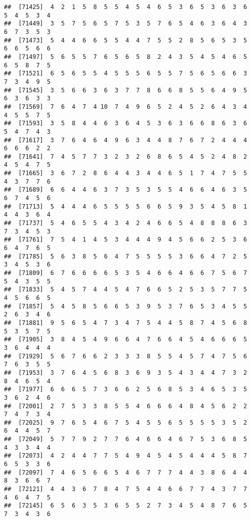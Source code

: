 \documentclass[
]{book}
\begin{document}
\begin{verbatim}
##  [71425]  4  2  1  5  8  5  5  4  5  4  6  5  3  6  5  3  6  3  6  5  4  5  3  4
##  [71449]  3  5  7  5  6  5  7  5  3  5  7  6  5  4  6  3  6  4  3  6  7  3  5  3
##  [71473]  5  4  4  6  6  5  5  4  4  7  5  5  2  8  5  6  5  3  5  6  6  5  6  6
##  [71497]  5  6  5  5  7  6  5  6  5  8  2  4  3  5  4  5  4  6  5  6  5  8  7  5
##  [71521]  6  5  6  5  5  4  5  5  5  6  5  5  7  5  6  5  6  6  3  7  3  4  9  5
##  [71545]  3  5  6  6  3  6  3  7  7  8  6  6  8  5  5  6  4  9  5  6  3  6  3  3
##  [71569]  7  6  4  7  4 10  7  4  9  6  5  2  4  5  2  6  4  3  4  4  5  5  7  5
##  [71593]  3  5  8  4  4  6  3  6  4  5  3  6  3  6  6  8  6  3  6  5  4  7  4  3
##  [71617]  3  7  6  4  6  4  9  6  3  4  4  8  7  6  7  2  4  4  4  6  6  6  2  2
##  [71641]  7  4  5  7  7  3  2  3  2  6  8  6  5  4  5  2  4  8  2  4  5  4  7  5
##  [71665]  3  6  7  2  8  6  4  4  3  4  4  6  5  1  7  4  7  5  5  4  3  7  7  6
##  [71689]  6  6  4  4  6  3  7  3  5  3  5  5  4  6  6  4  6  3  5  6  7  4  5  6
##  [71713]  5  4  4  4  6  5  5  5  5  6  6  5  9  3  5  4  5  8  1  4  4  3  6  4
##  [71737]  5  4  6  5  5  4  3  4  2  4  6  6  5  4  8  8  8  6  3  7  3  4  5  3
##  [71761]  7  5  4  1  4  5  3  4  4  4  9  4  5  6  6  2  5  3  6  6  4  7  6  5
##  [71785]  5  6  3  8  5  6  4  7  5  5  5  5  3  6  6  4  7  2  5  3  4  5  3  6
##  [71809]  6  7  6  6  6  6  5  3  5  4  6  6  4  6  6  7  5  6  7  5  4  3  5  5
##  [71833]  5  4  5  7  4  4  5  4  7  6  6  5  2  5  3  5  7  7  5  4  5  6  6  5
##  [71857]  5  4  5  8  5  6  6  5  3  9  5  3  7  6  5  3  4  5  5  2  6  3  4  6
##  [71881]  9  5  6  5  4  7  3  4  7  5  4  4  5  8  7  4  5  6  8  5  3  5  7  5
##  [71905]  3  8  4  5  4  9  6  6  4  7  6  6  4  5  4  6  6  6  5  3  6  4  4  4
##  [71929]  5  6  7  6  6  2  3  3  3  8  5  5  4  5  7  4  7  5  6  7  6  3  5  5
##  [71953]  3  7  6  4  5  6  8  3  6  9  3  5  4  3  4  4  7  3  2  8  4  6  5  4
##  [71977]  6  6  6  5  7  3  6  6  2  5  6  8  5  3  4  6  5  3  5  3  6  2  4  6
##  [72001]  2  7  5  3  3  8  5  5  4  6  6  6  4  8  4  5  6  2  2  7  4  7  3  4
##  [72025]  9  7  6  5  4  6  7  5  4  5  5  6  5  5  5  5  3  5  2  6  4  4  5  7
##  [72049]  5  7  7  9  2  7  7  6  4  6  6  4  6  7  5  3  6  8  5  4  3  3  4  4
##  [72073]  4  2  4  4  7  7  5  4  9  4  5  4  5  4  4  4  5  8  7  6  5  3  3  6
##  [72097]  7  4  6  5  6  6  5  4  6  7  7  7  4  4  3  8  6  4  4  8  3  6  6  7
##  [72121]  4  4  3  6  7  8  4  7  5  4  4  6  6  7  7  4  3  7  7  4  6  4  7  5
##  [72145]  6  5  6  3  5  3  6  5  5  2  7  3  4  5  4  8  7  6  5  7  3  4  3  6

\end{verbatim}
\end{document}
